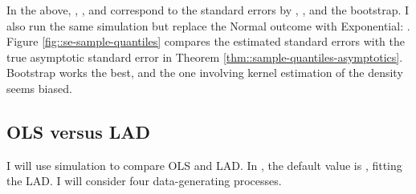 In the above, , , and  correspond to the standard errors by \citet{koenker1978regression}, \citet{powell1991estimation}, and the bootstrap. 
I also run the same simulation but replace the Normal outcome with Exponential: . Figure \ref{fig::se-sample-quantiles} compares the estimated standard errors with the true asymptotic standard error in Theorem \ref{thm::sample-quantiles-asymptotics}. Bootstrap works the best, and the one involving kernel estimation of the density seems biased. 






\subsection{OLS versus LAD}


I will use simulation to compare OLS and LAD. In , the default value is , fitting the LAD. 
I will consider four data-generating processes.

